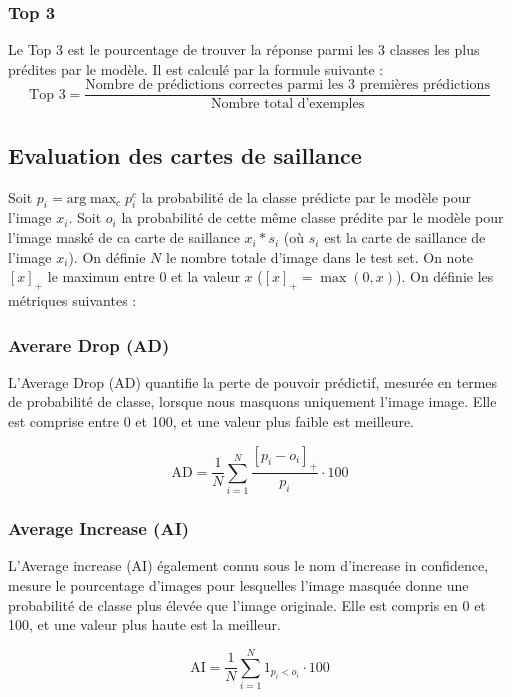 \subsubsection{Top 3}
Le Top 3 est le pourcentage de trouver la réponse parmi les 3 classes les plus prédites par le modèle. Il est calculé par la formule suivante :
\begin{equation}
    \text{Top 3} = \frac{\text{Nombre de prédictions correctes parmi les 3 premières prédictions}}{\text{Nombre total d'exemples}}
\end{equation}

\subsection{Evaluation des cartes de saillance}
\label{sec: grad metrics}

Soit $p_i = \text{arg}\max_c p_i^c$ la probabilité de la classe prédicte par le modèle pour l'image $x_i$. Soit $o_i$ la probabilité de cette même classe prédite par le modèle pour l'image maské de ca carte de saillance $x_i * s_i$ (où $s_i$ est la carte de saillance de l'image $x_i$). On définie $N$ le nombre totale d'image dans le test set. On note $[x]_+$ le maximun entre $0$ et la valeur $x$ ($[x]_+=\max(0, x)$). On définie les métriques suivantes :

\subsubsection{Averare Drop (AD)}
L'Average Drop (AD) quantifie la perte de pouvoir prédictif, mesurée en termes de probabilité de classe, lorsque nous masquons uniquement l'image image. Elle est comprise entre 0 et 100, et une valeur plus faible est meilleure.

\begin{equation}
    \text{AD} = \frac{1}{N} \sum_{i=1}^{N} \frac{[p_i - o_i]_+}{p_i} \cdot 100
\end{equation}

\subsubsection{Average Increase (AI)}
L'Average increase (AI) également connu sous le nom d'increase in confidence, mesure le pourcentage d'images pour lesquelles l'image masquée donne une probabilité de classe plus élevée que l'image originale. Elle est compris en 0 et 100, et une valeur plus haute est la meilleur.

\begin{equation}
    \text{AI} = \frac{1}{N} \sum_{i=1}^{N} 1_{p_i<o_i} \cdot 100
\end{equation}

